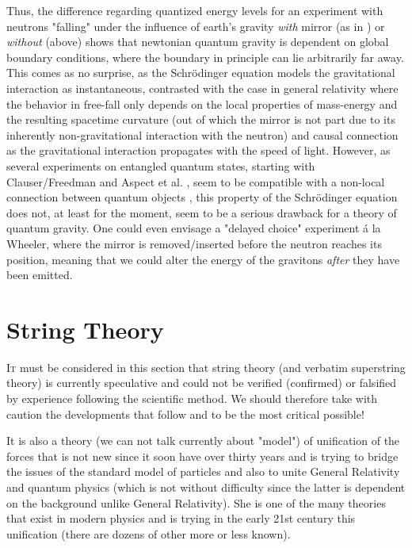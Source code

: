 	Thus, the difference regarding quantized energy levels for an
	experiment with neutrons "falling" under the influence of earth's
	gravity \textit{with} mirror (as in \cite{Nezvishevsky}) or
	\textit{without} (above) shows that newtonian quantum gravity is
	dependent on global boundary conditions, where the boundary in
	principle can lie arbitrarily far away. This comes as no surprise,
	as the Schr\"{o}dinger equation models the gravitational
	interaction as instantaneous, contrasted with the case in general
	relativity where the behavior in free-fall only depends on the
	local properties of mass-energy and the resulting spacetime
	curvature (out of which the mirror is not part due to its
	inherently non-gravitational interaction with the neutron) and
	causal connection as the gravitational interaction propagates with
	the speed of light. However, as several experiments on entangled
	quantum states, starting with Clauser/Freedman \cite{Clauser} and
	Aspect et al. \cite{Aspect}, seem to be compatible with a
	non-local connection between quantum objects \cite{Bell}, this
	property of the Schr\"{o}dinger equation does not, at least for
	the moment, seem to be a serious drawback for a theory of quantum
	gravity. One could even envisage a "delayed choice" experiment
	\'{a} la Wheeler, where the mirror is removed/inserted before the
	neutron reaches its position, meaning that we could alter the
	energy of the gravitons \textit{after} they have been emitted.

	\newpage
	\thispagestyle{empty}
	\mbox{}
	\section{String Theory}\label{string theory}
	\lettrine[lines=4]{\color{BrickRed}I}t must be considered in this section that string theory (and verbatim superstring theory) is currently speculative and could not be verified (confirmed) or falsified by experience following the scientific method. We should therefore take with caution the developments that follow and to be the most critical possible!
	
	It is also a theory (we can not talk currently about "model") of unification of the forces that is not new since it soon have over thirty years and is trying to bridge the issues of the standard model of particles and also to unite General Relativity and quantum physics (which is not without difficulty since the latter is dependent on the background unlike General Relativity). She is one of the many theories that exist in modern physics and is trying in the early 21st century this unification (there are dozens of other more or less known).
	
